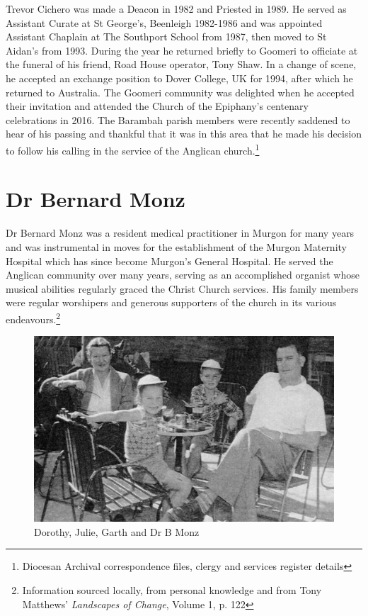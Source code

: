 Trevor Cichero was made a Deacon in 1982 and Priested in 1989. He served as Assistant Curate at St George's, Beenleigh 1982-1986 and was appointed Assistant Chaplain at The Southport School from 1987, then moved to St Aidan's from 1993. During the year he returned briefly to Goomeri to officiate at the funeral of his friend, Road House operator, Tony Shaw. In a change of scene, he accepted an exchange position to Dover College, UK for 1994, after which he returned to Australia. The Goomeri community was delighted when he accepted their invitation and attended the Church of the Epiphany's centenary celebrations in 2016. The Barambah parish members were recently saddened to hear of his passing and thankful that it was in this area that he made his decision to follow his calling in the service of the Anglican church.\footnote{Diocesan Archival correspondence files, clergy and services register details}


\section{Dr Bernard Monz}



Dr Bernard Monz was a resident medical practitioner in Murgon for many years and was instrumental in moves for the establishment of the Murgon Maternity Hospital which has since become Murgon's General Hospital. He served the Anglican community over many years, serving as an accomplished organist whose musical abilities regularly graced the Christ Church services. His family members were regular worshipers and generous supporters of the church in its various endeavours.\footnote{Information sourced locally, from personal knowledge and from Tony Matthews' \emph{Landscapes of Change}, Volume 1, p. 122}








\begin{figure}
\begin{center}
\includegraphics[width=1.\linewidth,center]{../images/monz.jpg}
\caption{Dorothy, Julie, Garth and Dr B Monz}
\end{center}
\end{figure}


